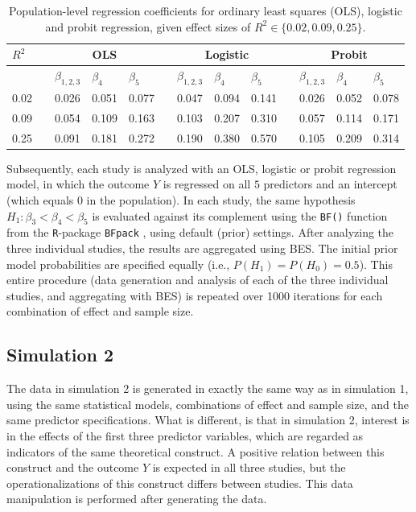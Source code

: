 \documentclass[11pt,reqno]{article}
\begin{document}
\begin{appendices}
\begin{table}[t]
\centering
\caption{Population-level regression coefficients for ordinary least squares (OLS), logistic and probit regression, given effect sizes of $R^2 \in \{0.02, 0.09, 0.25\}$.}
\label{coefs}
\begin{tabular}{lllllllllllll}
  \toprule
  $R^2$ & & \multicolumn{3}{c}{OLS} & & \multicolumn{3}{c}{Logistic} & & \multicolumn{3}{c}{Probit} \\
 \midrule
  &   & $\beta_{1, 2, 3}$ & $\beta_4$ & $\beta_5$ &   & $\beta_{1, 2, 3}$ & $\beta_4$ & $\beta_5$ &   & $\beta_{1, 2, 3}$ & $\beta_4$ & $\beta_5$ \\
   \midrule
0.02 &   & 0.026 & 0.051 & 0.077 &   & 0.047 & 0.094 & 0.141 &   & 0.026 & 0.052 & 0.078 \\
  0.09 &   & 0.054 & 0.109 & 0.163 &   & 0.103 & 0.207 & 0.310 &   & 0.057 & 0.114 & 0.171 \\
  0.25 &   & 0.091 & 0.181 & 0.272 &   & 0.190 & 0.380 & 0.570 &   & 0.105 & 0.209 & 0.314 \\
   \bottomrule
\end{tabular}
\end{table}

Subsequently, each study is analyzed with an OLS, logistic or probit regression model, in which the outcome $Y$ is regressed on all $5$ predictors and an intercept (which equals 0 in the population).
In each study, the same hypothesis $H_1: \beta_3 < \beta_4 < \beta_5$ is evaluated against its complement using the \texttt{BF()} function from the \texttt{R}-package \texttt{BFpack} \autocite[][Version 1.0.0]{BFpack}, using default (prior) settings.
After analyzing the three individual studies, the results are aggregated using BES. 
The initial prior model probabilities are specified equally (i.e., $P(H_1) = P(H_0) = 0.5$).
This entire procedure (data generation and analysis of each of the three individual studies, and aggregating with BES) is repeated over 1000 iterations for each combination of effect and sample size.

\subsection{Simulation 2}

The data in simulation 2 is generated in exactly the same way as in simulation 1, using the same statistical models, combinations of effect and sample size, and the same predictor specifications.
What is different, is that in simulation 2, interest is in the effects of the first three predictor variables, which are regarded as indicators of the same theoretical construct.
A positive relation between this construct and the outcome $Y$ is expected in all three studies, but the operationalizations of this construct differs between studies.
This data manipulation is performed after generating the data.


\end{appendices}
\end{document}
